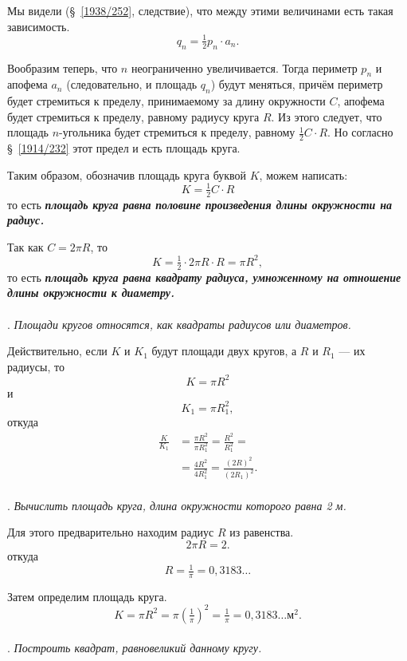 \documentclass[twoside]{book}
\begin{document}
Мы видели (§~\ref{1938/252}, следствие), что между этими величинами есть такая зависимость.
\[q_n=\tfrac12p_n\cdot a_n.\]

Вообразим теперь, что $n$ неограниченно увеличивается.
Тогда периметр $p_n$ и апофема  $a_n$ (следовательно, и площадь $q_n$) будут меняться, причём периметр будет стремиться к пределу, принимаемому за длину окружности $C$, апофема будет стремиться к пределу, равному радиусу круга $R$.
Из этого следует, что площадь $n$-угольника будет стремиться к пределу, равному $\tfrac12 C\cdot R$.
Но согласно §~\ref{1914/232} этот предел и есть площадь круга.

Таким образом, обозначив площадь круга буквой $K$, можем написать:
\[K=\tfrac12 C\cdot R\]
то есть \emph{\textbf{площадь круга равна половине произведения длины окружности на радиус.}}


Так как $C=2\pi R$, то
\[K=\tfrac12\cdot 2\pi  R\cdot R=\pi R^2,\]
то есть \emph{\textbf{площадь круга равна квадрату радиуса, умноженному на отношение длины окружности к диаметру.}}

\paragraph{}\label{1938/265}
.
\emph{Площади кругов относятся, как квадраты радиусов или диаметров.}

Действительно, если $K$ и $K_1$ будут площади двух кругов, а $R$ и $R_1$ — их радиусы, то
\[K=\pi R^2\]
и
\[K_1=\pi R_1^2,\]
откуда
\begin{align*}
\frac{K}{K_1}&=\frac{\pi R^2}{\pi R^2_1}=\frac{R^2}{R^2_1}=
\\
&=\frac{4R^2}{4R^2_1}=\frac{(2R)^2}{(2R_1)^2}.
\end{align*}


\paragraph{}\label{1938/266}
.
\emph{Вычислить площадь круга, длина окружности которого равна 2 м.}

Для этого предварительно находим радиус $R$ из равенства.
\[2\pi R= 2.\]
откуда
\[R=\tfrac1\pi=0{,}3183\dots\]

Затем определим площадь круга.
\[K=\pi R^2=\pi(\tfrac1\pi)^2=\tfrac1\pi=0{,}3183\dots\text{м}^2.\]

\paragraph{}\label{1938/267}
.
\emph{Построить квадрат, равновеликий данному кругу.}
\end{document}
